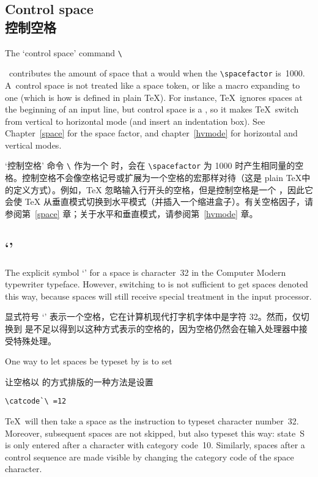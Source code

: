 \subsection{Control space\\控制空格}

The `control space' command \verb-\-
\cstoidx{}\par\
contributes the amount of space that a  would
when the \verb=\spacefactor= is~1000.
A~control space
is not treated like a space token, or like a macro
expanding to one (which is how  is defined in plain \TeX).
For instance, \TeX\ ignores spaces
at the beginning of an input line, but
control space is a , so it 
makes \TeX\ switch from vertical to horizontal mode
(and insert an indentation box).
See  Chapter~\ref{space} for the space factor, and
chapter~\ref{hvmode} for horizontal and vertical modes.

`控制空格' 命令 \verb-\- 作为一个  时，会在 \verb=\spacefactor= 为 1000 时产生相同量的空格。控制空格不会像空格记号或扩展为一个空格的宏那样对待（这是 plain \TeX 中  的定义方式）。例如，\TeX{} 忽略输入行开头的空格，但是控制空格是一个 ，因此它会使 \TeX{} 从垂直模式切换到水平模式（并插入一个缩进盒子）。有关空格因子，请参阅第~\ref{space} 章；关于水平和垂直模式，请参阅第~\ref{hvmode} 章。


\subsection{`\n{\char32}'}

The explicit symbol `' for a space
is character~32 in the Computer Modern typewriter typeface.
However, switching to  is not sufficient to get
spaces denoted this way, because spaces will still
receive special treatment in the input processor.

显式符号 `' 表示一个空格，它在计算机现代打字机字体中是字符 32。然而，仅切换到  是不足以得到以这种方式表示的空格的，因为空格仍然会在输入处理器中接受特殊处理。

One way to
let spaces be typeset by 
is to set 

让空格以  的方式排版的一种方法是设置\begin{verbatim}
\catcode`\ =12
\end{verbatim}
\TeX\ will then take a space as the instruction to
typeset character number~32. Moreover, subsequent spaces
are not skipped, but also typeset this way: state~{\italic S}
\awp
is only entered after a character with category code~10.
Similarly, spaces after a control sequence are made
visible by changing the category code of the space character.

